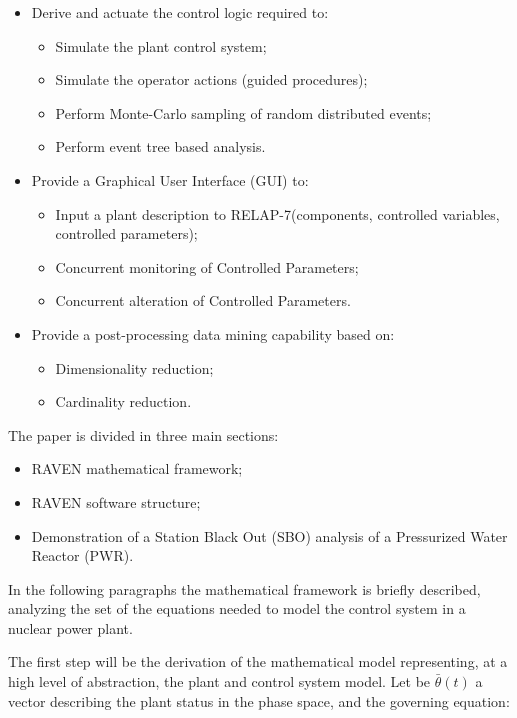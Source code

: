 \documentclass{mc2013}
\begin{document}
\begin{itemize}
\item Derive and actuate the control logic required to:
\begin{itemize}
\item Simulate the plant control system;
\item Simulate the operator actions (guided procedures);
\item Perform Monte-Carlo sampling of random distributed events;
\item Perform event tree based analysis.
\end{itemize}

\item Provide a Graphical User Interface (GUI) to:
\begin{itemize}
\item Input a plant description to RELAP-7(components, controlled variables, controlled
parameters);
\item Concurrent monitoring of Controlled Parameters;
\item Concurrent alteration of Controlled Parameters.
\end{itemize}

\item Provide a post-processing data mining capability based on:
\begin{itemize}
\item Dimensionality reduction;
\item Cardinality reduction.
\end{itemize}

\end{itemize}

The paper is divided in three main sections:
\begin{itemize}
\item RAVEN mathematical framework;
\item RAVEN software structure;
\item Demonstration of a Station Black Out (SBO) analysis of a Pressurized Water Reactor (PWR).
\end{itemize}


\label{sec:mathFramework}
In the following paragraphs the mathematical framework is briefly described, analyzing the set of the
equations needed to model the control system in a nuclear power plant.

\label{sec:PlantControlModel}
The first step will be the derivation of the mathematical model representing, at a high level of abstraction,
the plant and control system model. Let be $\bar{\theta}(t)$ a vector describing the plant status in the phase space, and the governing equation:
\end{document}
